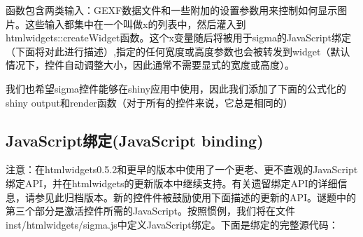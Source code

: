 \documentclass[]{book}
\newenvironment{Shaded}{\begin{snugshade}}{\end{snugshade}}
\newcommand{\KeywordTok}[1]{\textcolor[rgb]{0.13,0.29,0.53}{\textbf{#1}}}
\newcommand{\DataTypeTok}[1]{\textcolor[rgb]{0.13,0.29,0.53}{#1}}
\newcommand{\StringTok}[1]{\textcolor[rgb]{0.31,0.60,0.02}{#1}}
\newcommand{\CommentTok}[1]{\textcolor[rgb]{0.56,0.35,0.01}{\textit{#1}}}
\newcommand{\OtherTok}[1]{\textcolor[rgb]{0.56,0.35,0.01}{#1}}
\newcommand{\ControlFlowTok}[1]{\textcolor[rgb]{0.13,0.29,0.53}{\textbf{#1}}}
\newcommand{\OperatorTok}[1]{\textcolor[rgb]{0.81,0.36,0.00}{\textbf{#1}}}
\newcommand{\NormalTok}[1]{#1}
\theoremstyle{definition}
\theoremstyle{definition}
\theoremstyle{definition}
\theoremstyle{remark}
\begin{document}
函数包含两类输入：GEXF数据文件和一些附加的设置参数用来控制如何显示图片。这些输入都集中在一个叫做x的列表中，然后灌入到htmlwidgets::createWidget函数。这个x变量随后将被用于sigma的JavaScript绑定（下面将对此进行描述）,指定的任何宽度或高度参数也会被转发到widget（默认情况下，控件自动调整大小，因此通常不需要显式的宽度或高度）。

我们也希望sigma控件能够在shiny应用中使用，因此我们添加了下面的公式化的shiny
output和render函数（对于所有的控件来说，它总是相同的）

\begin{Shaded}
\end{Shaded}

\subsection{JavaScript绑定(JavaScript
binding)}\label{javascriptjavascript-binding}

注意：在htmlwidgets0.5.2和更早的版本中使用了一个更老、更不直观的JavaScript绑定API，并在htmlwidgets的更新版本中继续支持。有关遗留绑定API的详细信息，请参见此归档版本。新的控件件被鼓励使用下面描述的更新的API。谜题中的第三个部分是激活控件所需的JavaScript。按照惯例，我们将在文件inst/htmlwidgets/sigma.js中定义JavaScript绑定。下面是绑定的完整源代码：
\end{document}
